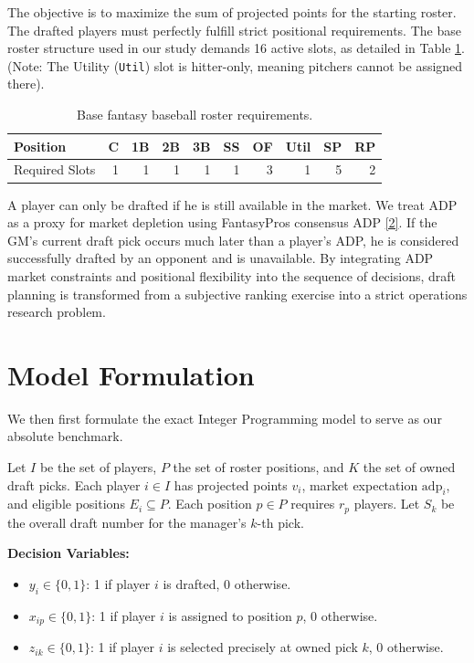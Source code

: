 \documentclass[11pt,a4paper]{article}
\begin{document}
The objective is to maximize the sum of projected points for the starting roster. The drafted players must perfectly fulfill strict positional requirements. The base roster structure used in our study demands 16 active slots, as detailed in Table \ref{tab:roster}. (Note: The Utility (\texttt{Util}) slot is hitter-only, meaning pitchers cannot be assigned there).

\begin{table}[H]
\centering
\caption{Base fantasy baseball roster requirements.}
\label{tab:roster}
\begin{tabular}{lrrrrrrrrr}
\toprule
Position & C & 1B & 2B & 3B & SS & OF & Util & SP & RP \\
\midrule
Required Slots & 1 & 1 & 1 & 1 & 1 & 3 & 1 & 5 & 2 \\
\bottomrule
\end{tabular}
\end{table}

A player can only be drafted if he is still available in the market. We treat ADP as a proxy for market depletion using FantasyPros consensus ADP \hyperref[ref:fantasypros-adp]{[2]}. If the GM's current draft pick occurs much later than a player's ADP, he is considered successfully drafted by an opponent and is unavailable. By integrating ADP market constraints and positional flexibility into the sequence of decisions, draft planning is transformed from a subjective ranking exercise into a strict operations research problem.

\section{Model Formulation}

We then first formulate the exact Integer Programming model to serve as our absolute benchmark. 

Let $I$ be the set of players, $P$ the set of roster positions, and $K$ the set of owned draft picks. Each player $i \in I$ has projected points $v_i$, market expectation $\text{adp}_i$, and eligible positions $E_i \subseteq P$. Each position $p \in P$ requires $r_p$ players. Let $S_k$ be the overall draft number for the manager's $k$-th pick.

\textbf{Decision Variables:}
\begin{itemize}[leftmargin=1.5em]
  \item $y_i \in \{0,1\}$: 1 if player $i$ is drafted, 0 otherwise.
  \item $x_{ip} \in \{0,1\}$: 1 if player $i$ is assigned to position $p$, 0 otherwise.
  \item $z_{ik} \in \{0,1\}$: 1 if player $i$ is selected precisely at owned pick $k$, 0 otherwise.
\end{itemize}
\end{document}
